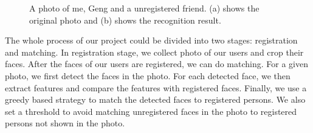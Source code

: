 \documentclass[paper=a4, fontsize=11pt]{scrartcl} %
\numberwithin{equation}{section} %
\numberwithin{figure}{section} %
\numberwithin{table}{section} %
\begin{document}
\begin{figure}[!htbp]
	\centering
	\caption{A photo of me, Geng and a unregistered friend. (a) shows the original photo and (b) shows the recognition result.}
	\label{fig:intro_recog}
\end{figure}

The whole process of our project could be divided into two stages: registration and matching. In registration stage, we collect photo of our users and crop their faces. After the faces of our users are registered, we can do matching. For a given photo, we first detect the faces in the photo. For each detected face, we then extract features and compare the features with registered faces. Finally, we use a greedy based strategy to match the detected faces to registered persons. We also set a threshold to avoid matching unregistered faces in the photo to registered persons not shown in the photo.
\end{document}
